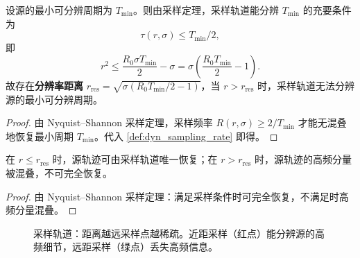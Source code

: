 \begin{theorem}[采样轨道的分辨率]\label{thm:dyn_sampling_resolution}
设源的最小可分辨周期为 $T_{\min}$。则由采样定理，采样轨道能分辨 $T_{\min}$ 的充要条件为
\[
\tau(r,\sigma)\le T_{\min}/2,
\]
即
\[
r^2\le\frac{R_0\sigma T_{\min}}{2}-\sigma=\sigma\left(\frac{R_0T_{\min}}{2}-1\right).
\]
故存在\textbf{分辨率距离} $r_{\text{res}}=\sqrt{\sigma(R_0T_{\min}/2-1)}$，当 $r>r_{\text{res}}$ 时，采样轨道无法分辨源的最小可分辨周期。
\end{theorem}

\begin{proof}
由 Nyquist–Shannon 采样定理，采样频率 $R(r,\sigma)\ge 2/T_{\min}$ 才能无混叠地恢复最小周期 $T_{\min}$。代入 \cref{def:dyn_sampling_rate} 即得。
\end{proof}

\begin{corollary}[采样轨道的信息可恢复性]\label{cor:dyn_sampling_recoverability}
在 $r\le r_{\text{res}}$ 时，源轨迹可由采样轨道唯一恢复；在 $r>r_{\text{res}}$ 时，源轨迹的高频分量被混叠，不可完全恢复。
\end{corollary}

\begin{proof}
由 Nyquist–Shannon 采样定理：满足采样条件时可完全恢复，不满足时高频分量混叠。
\end{proof}

\begin{figure}[htbp]
\centering
{}
\caption{采样轨道：距离越远采样点越稀疏。近距采样（红点）能分辨源的高频细节，远距采样（绿点）丢失高频信息。}
\label{fig:dyn_sampling_orbit}
\end{figure}

